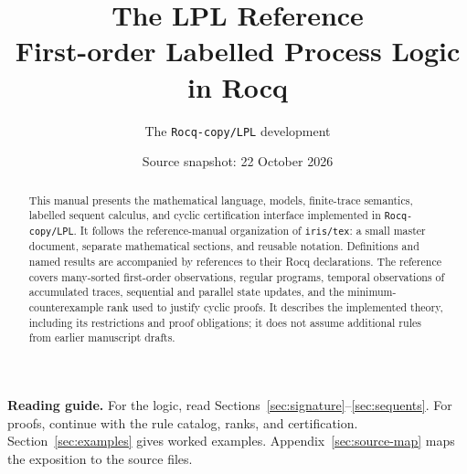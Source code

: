 \documentclass[10pt,a4paper]{article}
\title{\bfseries The LPL Reference\\[0.4em]
  \large First-order Labelled Process Logic in Rocq}
\author{The \texttt{Rocq-copy/LPL} development}
\date{Source snapshot: 22 October 2026}
\begin{document}
\maketitle
\thispagestyle{empty}
\begin{abstract}
This manual presents the mathematical language, models, finite-trace semantics,
labelled sequent calculus, and cyclic certification interface implemented in
\texttt{Rocq-copy/LPL}. It follows the reference-manual organization of
\texttt{iris/tex}: a small master document, separate mathematical sections,
and reusable notation. Definitions and named results are accompanied by
references to their Rocq declarations. The reference covers many-sorted
first-order observations, regular programs, temporal observations of accumulated
traces, sequential and parallel state updates, and the minimum-counterexample
rank used to justify cyclic proofs. It describes the implemented theory,
including its restrictions and proof obligations; it does not assume additional
rules from earlier manuscript drafts.
\end{abstract}
\vfill
\noindent\textbf{Reading guide.}
For the logic, read Sections~\ref{sec:signature}--\ref{sec:sequents}.
For proofs, continue with the rule catalog, ranks, and certification.
Section~\ref{sec:examples} gives worked examples.
Appendix~\ref{sec:source-map} maps the exposition to the source files.
\clearpage
\tableofcontents
\clearpage











\appendix

\end{document}
